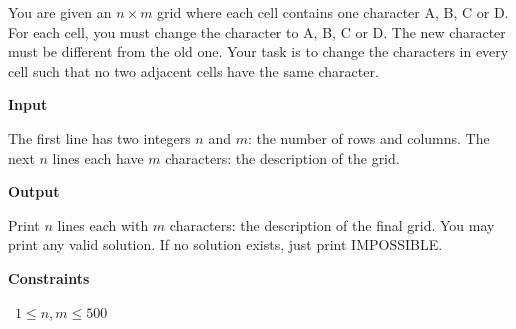 You are given an $n\times m$ grid where each cell contains one character A, B, C or D.
For each cell, you must change the character to A, B, C or D. The new character must be different from the old one.
Your task is to change the characters in every cell such that no two adjacent cells have the same character.

\vspace{0.3cm}\noindent\textbf{Input}

The first line has two integers $n$ and $m$: the number of rows and columns.
The next $n$ lines each have $m$ characters: the description of the grid.

\vspace{0.3cm}\noindent\textbf{Output}

Print $n$ lines each with $m$ characters: the description of the final grid.
You may print any valid solution.
If no solution exists, just print IMPOSSIBLE.

\vspace{0.3cm}\noindent\textbf{Constraints}

\textbullet\ $1 \le n, m \le 500$